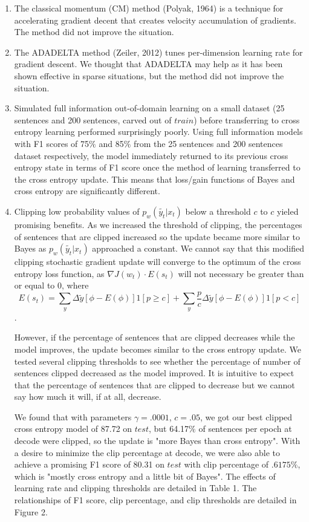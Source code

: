 \documentclass{article}
\begin{document}
\begin{enumerate}
\item The classical momentum (CM) method (Polyak, 1964) is a technique for accelerating gradient decent that creates velocity accumulation of gradients. The method did not improve the situation.
\item The ADADELTA method (Zeiler, 2012) tunes per-dimension learning rate for gradient descent. We thought that ADADELTA may help as it has been shown effective in sparse situations, but the method did not improve the situation. 
\item Simulated full information out-of-domain learning on a small dataset (25 sentences and 200 sentences, carved out of $train$) before transferring to cross entropy learning performed surprisingly poorly. Using full information models with F1 scores of 75$\%$ and 85$\%$  from the 25 sentences and 200 sentences dataset respectively,  the model immediately returned to its previous cross entropy state in terms of F1 score once the method of learning transferred to the cross entropy update. This means that loss/gain functions of Bayes and cross entropy are significantly different.  
\item Clipping low probability values of $p_{w}(\tilde{y_{t}}|x_{t})$ below a threshold $c$ to $c$ yieled promising benefits.  As we increased the threshold of clipping, the percentages of sentences that are clipped increased so the update became more similar to Bayes as $p_{w}(\tilde{y_{t}}|x_{t})$  approached a constant.  We cannot say that this modified clipping stochastic gradient update will converge to the optimum of the cross entropy loss function, as $\nabla J(w_{t}) \cdot  E (s_{t})$ will not necessary be greater than or equal to $0$, where $$E(s_{t})=\sum_{y}\Delta \tilde{y}[\phi - E(\phi)]1[p \geq c] + \sum_{y}\frac{p}{c}\Delta \tilde{y}[\phi - E(\phi)]1[p<c]$$.

However, if the percentage of sentences that are clipped decreases while the model improves, the update becomes similar to the cross entropy update. We tested several clipping thresholds to see whether the percentage of number of sentences clipped decreased as the model improved. It is intuitive to expect that the percentage of sentences that are clipped to decrease but we cannot say how much it will, if at all, decrease. 

We found that with parameters $\gamma=.0001$, $c=.05$, we got our best clipped cross entropy model of 87.72 on $test$, but 64.17$\%$ of sentences per epoch at decode were clipped, so the update is "more Bayes than cross entropy". With a desire to minimize the clip percentage at decode, we were also able to achieve a promising F1 score of 80.31 on $test$ with clip percentage of $.6175\%$, which is "mostly cross entropy and a little bit of Bayes".   The effects of learning rate and clipping thresholds are detailed in Table 1. The relationships of F1 score, clip percentage, and clip thresholds are detailed in Figure 2.




\end{enumerate}
\end{document}
